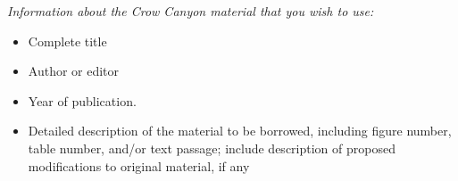 \documentclass[
  12pt,
]{krantz}
\begin{document}
\emph{Information about the Crow Canyon material that you wish to use:}

\begin{itemize}
\item
  Complete title
\item
  Author or editor
\item
  Year of publication.
\item
  Detailed description of the material to be borrowed, including figure
  number, table number, and/or text passage; include description of
  proposed modifications to original material, if any
\end{itemize}

  

\backmatter
\printindex
\end{document}

